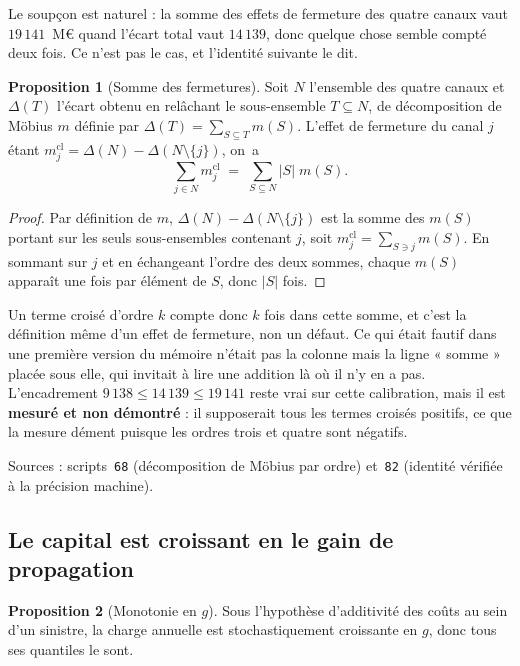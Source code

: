 \documentclass[12pt,a4paper]{article}
\theoremstyle{definition}
\newtheorem{proposition}{Proposition}
\begin{document}
Le soupçon est naturel : la somme des effets de fermeture des quatre canaux vaut
$19\,141$~M\euro{} quand l'écart total vaut $14\,139$, donc quelque chose semble
compté deux fois. Ce n'est pas le cas, et l'identité suivante le dit.

\begin{proposition}[Somme des fermetures]
\label{prop:fermeture}
Soit $N$ l'ensemble des quatre canaux et $\Delta(T)$ l'écart obtenu en relâchant
le sous-ensemble $T \subseteq N$, de décomposition de Möbius $m$ définie par
$\Delta(T) = \sum_{S \subseteq T} m(S)$. L'effet de fermeture du canal $j$ étant
$m^{\mathrm{cl}}_j = \Delta(N) - \Delta(N \setminus \{j\})$, on~a
\[
  \sum_{j \in N} m^{\mathrm{cl}}_j \;=\; \sum_{S \subseteq N} |S|\; m(S).
\]
\end{proposition}

\begin{proof}
Par définition de $m$, $\Delta(N) - \Delta(N\setminus\{j\})$ est la somme des
$m(S)$ portant sur les seuls sous-ensembles contenant $j$, soit
$m^{\mathrm{cl}}_j = \sum_{S \ni j} m(S)$. En sommant sur $j$ et en échangeant
l'ordre des deux sommes, chaque $m(S)$ apparaît une fois par élément de $S$, donc
$|S|$ fois.
\end{proof}

Un terme croisé d'ordre $k$ compte donc $k$ fois dans cette somme, et c'est la
définition même d'un effet de fermeture, non un défaut. Ce qui était fautif dans une
première version du mémoire n'était pas la colonne mais la ligne « somme » placée
sous elle, qui invitait à lire une addition là où il n'y en a pas. L'encadrement
$9\,138 \le 14\,139 \le 19\,141$ reste vrai sur cette calibration, mais il est
\textbf{mesuré et non démontré} : il supposerait tous les termes croisés positifs,
ce que la mesure dément puisque les ordres trois et quatre sont négatifs.

\vspace{4pt}
\noindent Sources : scripts~\texttt{68} (décomposition de Möbius par ordre)
et~\texttt{82} (identité vérifiée à la précision machine).

\subsection*{Le capital est croissant en le gain de propagation}

\begin{proposition}[Monotonie en $g$]
\label{prop:monotone}
Sous l'hypothèse d'additivité des coûts au sein d'un sinistre, la charge annuelle
est stochastiquement croissante en $g$, donc tous ses quantiles le sont.
\end{proposition}
\end{document}
